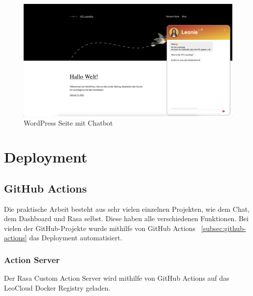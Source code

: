 \begin{figure}[hbt!]
    \centering
    \includegraphics[scale=0.2]{pics/wordpresspage}
    \caption{WordPress Seite mit Chatbot}
    \label{fig:impl:wordpresspage}
\end{figure}

\section{Deployment}

\subsection{GitHub Actions}

Die praktische Arbeit besteht aus sehr vielen einzelnen Projekten, wie dem Chat, dem Dashboard und Rasa selbst.
Diese haben alle verschiedenen Funktionen.
Bei vielen der GitHub-Projekte wurde mithilfe von GitHub Actions ~\ref{subsec:github-actions} das Deployment automatisiert.

\subsubsection{Action Server}
Der Rasa Custom Action Server wird mithilfe von GitHub Actions auf das LeoCloud Docker Registry geladen.


